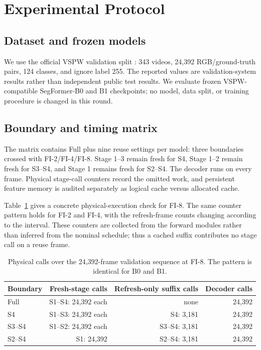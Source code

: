 \documentclass{article}
\begin{document}
\section{Experimental Protocol}
\subsection{Dataset and frozen models}
We use the official VSPW validation split \cite{miao2021vspw}: 343 videos, 24,392 RGB/ground-truth pairs, 124 classes, and ignore label 255. The reported values are validation-system results rather than independent public test results. We evaluate frozen VSPW-compatible SegFormer-B0 and B1 checkpoints; no model, data split, or training procedure is changed in this round.

\subsection{Boundary and timing matrix}
The matrix contains Full plus nine reuse settings per model: three boundaries crossed with FI-2/FI-4/FI-8. Stage 1--3 remain fresh for S4, Stage 1--2 remain fresh for S3--S4, and Stage 1 remains fresh for S2--S4. The decoder runs on every frame. Physical stage-call counters record the omitted work, and persistent feature memory is audited separately as logical cache versus allocated cache.

Table~\ref{tab:calls} gives a concrete physical-execution check for FI-8. The same counter pattern holds for FI-2 and FI-4, with the refresh-frame counts changing according to the interval. These counters are collected from the forward modules rather than inferred from the nominal schedule; thus a cached suffix contributes no stage call on a reuse frame.

\begin{table}[t]
\centering
\caption{Physical calls over the 24,392-frame validation sequence at FI-8. The pattern is identical for B0 and B1.}
\label{tab:calls}
\scriptsize
\setlength{\tabcolsep}{2.5pt}
\begin{tabular}{lrrr}
\toprule
Boundary & Fresh-stage calls & Refresh-only suffix calls & Decoder calls \\
\midrule
Full & S1--S4: 24,392 each & none & 24,392 \\
S4 & S1--S3: 24,392 each & S4: 3,181 & 24,392 \\
S3--S4 & S1--S2: 24,392 each & S3--S4: 3,181 & 24,392 \\
S2--S4 & S1: 24,392 & S2--S4: 3,181 & 24,392 \\
\bottomrule
\end{tabular}
\end{table}
\end{document}
